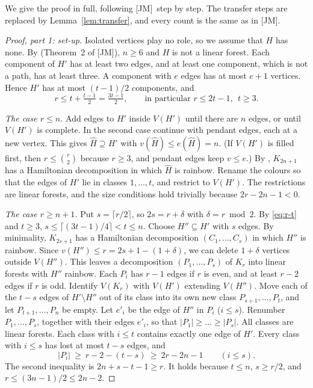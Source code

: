 \documentclass[11pt]{amsart}
\theoremstyle{definition}
\theoremstyle{remark}
\newcommand{\JM}{\textup{[JM]}}
\begin{document}
We give the proof in full, following \JM\ step by step. The transfer steps are replaced by
Lemma~\ref{lem:transfer}, and every count is the same as in \JM.

\begin{proof}[Proof, part 1: set-up]
Isolated vertices play no role, so we assume that $H$ has none. By \cite{LC} (Theorem~2
of \JM), $n\ge6$ and $H$ is not a linear forest. Each component of
$H'$ has at least two edges, and at least one component, which is not a path, has at least
three. A component with $e$ edges has at most $e+1$ vertices. Hence $H'$ has at most $(t-1)/2$
components, and
\begin{equation}\label{eq:r-t}
r\le t+\tfrac{t-1}{2}=\tfrac{3t-1}{2},\qquad\text{in particular } r\le 2t-1,\ \ t\ge3 .
\end{equation}

\emph{The case $r\le n$.} Add edges to $H'$ inside $V(H')$ until there are $n$ edges, or until
$V(H')$ is complete. In the second case continue with pendant edges, each at a new vertex.
This gives $\widehat H\supseteq H'$ with $v(\widehat H)\le e(\widehat H)=n$. (If $V(H')$ is
filled first, then $r\le\binom r2$ because $r\ge3$, and pendant edges keep $v\le e$.) By
\cite{LC}, $K_{2n+1}$ has a Hamiltonian decomposition in which $\widehat H$ is rainbow. Rename
the colours so that the edges of $H'$ lie in classes $1,\dots,t$, and restrict to $V(H')$. The
restrictions are linear forests, and the size conditions hold trivially because $2r-2n-1<0$.

\emph{The case $r\ge n+1$.} Put $s=\lceil r/2\rceil$, so $2s=r+\delta$ with $\delta=r\bmod 2$.
By \eqref{eq:r-t} and $t\ge3$, $s\le\lceil(3t-1)/4\rceil<t\le n$. Choose $H''\subseteq H'$ with $s$ edges. By minimality,
$K_{2s+1}$ has a Hamiltonian decomposition $(C_1,\dots,C_s)$ in which $H''$ is rainbow. Since
$v(H'')\le r=2s+1-(1+\delta)$, we can delete $1+\delta$ vertices outside $V(H'')$. This leaves a
decomposition $(P_1,\dots,P_s)$ of $K_r$ into linear forests with $H''$ rainbow. Each $P_i$ has
$r-1$ edges if $r$ is even, and at least $r-2$ edges if $r$ is odd. Identify $V(K_r)$ with
$V(H')$ extending $V(H'')$. Move each of the $t-s$ edges of $H'\setminus H''$ out of its class
into its own new class $P_{s+1},\dots,P_t$, and let $P_{t+1},\dots,P_n$ be empty. Let $e'_i$ be
the edge of $H''$ in $P_i$ ($i\le s$). Renumber $P_1,\dots,P_s$, together with their edges
$e'_i$, so that $|P_1|\ge\dots\ge|P_s|$. All classes are linear forests. Each class with $i\le t$
contains exactly one edge of $H'$. Every class with $i\le s$ has lost at most $t-s$ edges, and
\begin{equation}\label{eq:nondonor}
|P_i|\ \ge\ r-2-(t-s)\ \ge\ 2r-2n-1\qquad(i\le s).
\end{equation}
The second inequality is $2n+s-t-1\ge r$. It holds because $t\le n$, $s\ge r/2$, and
$r\le(3n-1)/2\le 2n-2$.


\end{proof}
\end{document}
